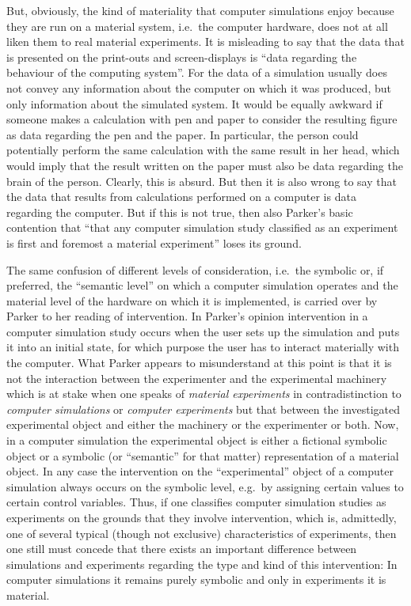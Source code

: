\documentclass[12pt, a4paper]{article}
\numberwithin{equation}{section}
\begin{document}
But, obviously, the kind of materiality that computer simulations enjoy because they are run on a material system, i.e.\ the computer hardware, does not at all liken them to real material experiments. It is misleading to say that the data that is presented on the print-outs and screen-displays is ``data regarding the behaviour of the computing system''. For the data of a simulation usually does not convey any information about the computer on which it was produced, but only information about the simulated system. It would be equally awkward if someone makes a calculation with pen and paper to consider the resulting figure as data regarding the pen and the paper.  In particular, the person could potentially perform the same calculation with the same result in her head, which would imply that the result written on the paper must also be data regarding the brain of the person. Clearly, this is absurd. But then it is also wrong to say that the data that results from calculations performed on a computer is data regarding the computer. But if this is not true, then also Parker's basic contention that ``that any computer simulation study classified as an experiment is first and foremost a material
experiment'' loses its ground.

The same confusion of different levels of consideration, i.e.\ the symbolic or, if preferred, the "`semantic level"' \citep{barberousse-et-al:2009} on which a computer simulation operates and the material level of the hardware on which it is implemented, is carried over by Parker to her reading of intervention. In Parker's opinion intervention in a computer simulation study occurs when the user sets up the simulation and puts it into an initial state, for which purpose the user has to interact materially with the computer. What Parker appears to misunderstand at this point is that it is not the interaction between the experimenter and the experimental machinery which is at stake when one speaks of {\em material experiments} in contradistinction to {\em computer simulations} or {\em computer experiments} but that between the investigated experimental object and either the machinery or the experimenter or both. Now, in a computer simulation the experimental object is either a fictional symbolic object or a symbolic (or ``semantic'' for that matter) representation of a material object. In any case the intervention on the ``experimental'' object of a computer simulation always occurs on the symbolic level, e.g.\ by assigning certain values to certain control variables. Thus, if one classifies computer simulation studies as experiments on the grounds that they involve intervention, which is, admittedly, one of several typical (though not exclusive) characteristics of experiments, then one still must concede that there exists an important difference between simulations and experiments regarding the type and kind of this intervention: In computer simulations it remains purely symbolic and only in experiments it is material.
\end{document}
